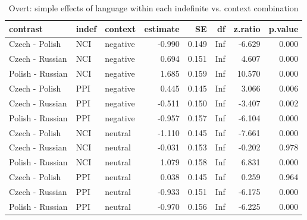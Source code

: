 \begin{table}[!h]
\centering
\caption{Overt: simple effects of language within each indefinite vs. context combination}
\centering
\begin{tabular}[t]{lllrrrrr}
\toprule
contrast & indef & context & estimate & SE & df & z.ratio & p.value\\
\midrule
Czech - Polish & NCI & negative & -0.990 & 0.149 & Inf & -6.629 & 0.000\\
Czech - Russian & NCI & negative & 0.694 & 0.151 & Inf & 4.607 & 0.000\\
Polish - Russian & NCI & negative & 1.685 & 0.159 & Inf & 10.570 & 0.000\\
Czech - Polish & PPI & negative & 0.445 & 0.145 & Inf & 3.066 & 0.006\\
Czech - Russian & PPI & negative & -0.511 & 0.150 & Inf & -3.407 & 0.002\\
\addlinespace
Polish - Russian & PPI & negative & -0.957 & 0.157 & Inf & -6.104 & 0.000\\
Czech - Polish & NCI & neutral & -1.110 & 0.145 & Inf & -7.661 & 0.000\\
Czech - Russian & NCI & neutral & -0.031 & 0.153 & Inf & -0.202 & 0.978\\
Polish - Russian & NCI & neutral & 1.079 & 0.158 & Inf & 6.831 & 0.000\\
Czech - Polish & PPI & neutral & 0.038 & 0.145 & Inf & 0.259 & 0.964\\
\addlinespace
Czech - Russian & PPI & neutral & -0.933 & 0.151 & Inf & -6.175 & 0.000\\
Polish - Russian & PPI & neutral & -0.970 & 0.156 & Inf & -6.225 & 0.000\\
\bottomrule
\end{tabular}
\end{table}
